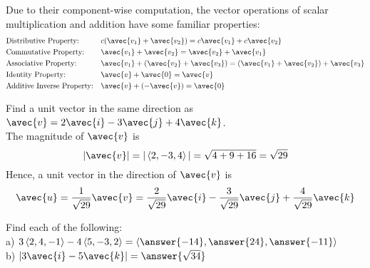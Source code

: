 \documentclass[handout]{ximera}
\begin{document}
Due to their component-wise computation, the vector operations of scalar multiplication and addition have some familiar properties:
\begin{align*}
&\text{Distributive Property:} & &c(\avec{v_1} + \avec{v_2}) = c\avec{v_1} + c\avec{v_2}   \\
& \text{Commutative Property:}& &\avec{v_1} + \avec{v_2} = \avec{v_2} + \avec{v_1} \\
& \text{Associative Property:}&  &\avec{v_1} + (\avec{v_2}+ \avec{v_3}) =  (\avec{v_1} + \avec{v_2}) + \avec{v_3} \\
&\text{Identity Property:} & &\avec{v} + \avec{0} = \avec{v} \\
& \text{Additive Inverse Property:} & &\avec{v} + (-\avec{v}) = \avec{0} 
\end{align*}

\begin{example}
Find a unit vector in the same direction as $\avec{v} = 2 \avec{i} - 3\avec{j} + 4\avec{k}$.\\
The magnitude of $\avec{v}$ is
\[
|\avec{v}| = |\vector{2, -3, 4}| = \sqrt{4+9+16} = \sqrt{29}
\]
Hence, a unit vector in the direction of $\avec{v}$ is
\[
\avec{u} = \frac{1}{\sqrt{29}}\avec{v} = \frac{2}{\sqrt{29}}\avec{i} - \frac{3}{\sqrt{29}}\avec{j} + \frac{4}{\sqrt{29}}\avec{k}
\]
\end{example}

\begin{problem}
Find each of the following:\\
a) $3\vector{2, 4, -1} - 4\vector{5, -3, 2} = \vector{\answer{-14}, \answer{24}, \answer{-11}}$\\
b) $|3\avec{i} - 5\avec{k}| = \answer{\sqrt{34}}$\\
\end{problem}
\end{document}
